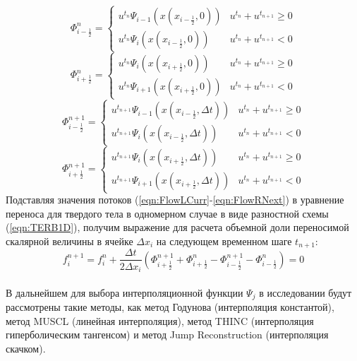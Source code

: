\documentclass[10pt,a4paper]{article}
\begin{document}
\begin{equation}
\label{eqn:FlowLCurr}
\Phi_{i-\frac{1}{2}}^n=\begin{cases}
u^{t_n} \Psi_{i-1}(x(x_{i-\frac{1}{2}}, 0))
& u^{t_n}+u^{t_{n+1}}\geq0
\\
u^{t_n} \Psi_{i}(x(x_{i-\frac{1}{2}}, 0))
& u^{t_n}+u^{t_{n+1}}<0
\end{cases}
\end{equation}
\begin{equation}
\label{eqn:FlowRCurr}
\Phi_{i+\frac{1}{2}}^n=\begin{cases}
u^{t_n} \Psi_{i}(x(x_{i+\frac{1}{2}}, 0))
& u^{t_n}+u^{t_{n+1}}\geq0
\\
u^{t_n} \Psi_{i+1}(x(x_{i+\frac{1}{2}}, 0))
& u^{t_n}+u^{t_{n+1}}<0
\end{cases}
\end{equation}
\begin{equation}
\label{eqn:FlowLNext}
\Phi_{i-\frac{1}{2}}^{n+1}=\begin{cases}
u^{t_{n+1}} \Psi_{i-1}(x(x_{i-\frac{1}{2}}, \Delta t))
& u^{t_n}+u^{t_{n+1}}\geq0
\\
u^{t_{n+1}} \Psi_{i}(x(x_{i-\frac{1}{2}}, \Delta t))
& u^{t_n}+u^{t_{n+1}}<0
\end{cases}
\end{equation}
\begin{equation}
\label{eqn:FlowRNext}
\Phi_{i+\frac{1}{2}}^{n+1}=\begin{cases}
u^{t_{n+1}} \Psi_{i}(x(x_{i+\frac{1}{2}}, \Delta t))
& u^{t_n}+u^{t_{n+1}}\geq0
\\
u^{t_{n+1}} \Psi_{i+1}(x(x_{i+\frac{1}{2}}, \Delta t))
& u^{t_n}+u^{t_{n+1}}<0
\end{cases}
\end{equation}
Подставляя значения потоков (\ref{eqn:FlowLCurr}-\ref{eqn:FlowRNext}) в уравнение переноса для твердого тела в одномерном случае в виде разностной схемы (\ref{eqn:TERB1D}), получим выражение для расчета объемной доли переносимой скалярной величины в ячейке $\Delta x_i$ на следующем временном шаге $t_{n+1}$:
\begin{equation}
\label{eqn:fNext}
f_i^{n+1}=f_i^n +
\frac{\Delta t}{2\Delta x_i} (
\Phi_{i+\frac{1}{2}}^{n+1}
+ \Phi_{i+\frac{1}{2}}^n
- \Phi_{i-\frac{1}{2}}^{n+1}
- \Phi_{i-\frac{1}{2}}^n
)=0
\end{equation}
\\В дальнейшем для выбора интерполяционной функции $\Psi_{j}$ в исследовании будут рассмотрены такие методы, как метод Годунова (интерполяция константой), метод MUSCL (линейная интерполяция), метод THINC (интерполяция гиперболическим тангенсом) и метод Jump Reconstruction (интерполяция скачком).
\end{document}
